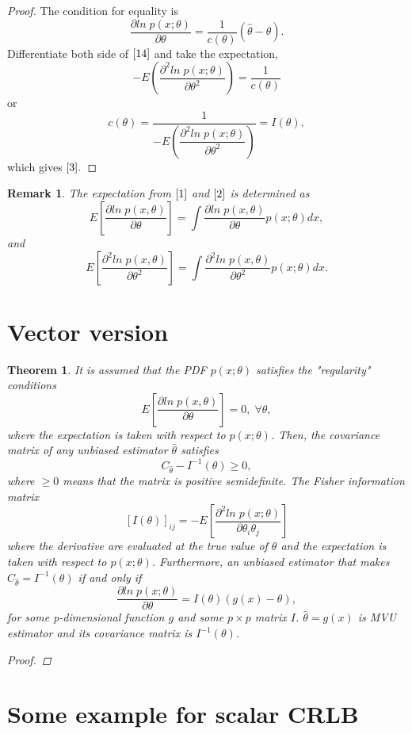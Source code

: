 \documentclass{article}
\newtheorem{theorem}{Theorem}
\newtheorem{remark}{Remark}
\begin{document}
\begin{proof}
The condition for equality is 
\begin{equation}\label{14}
\dfrac{\partial ln\; p(x;\theta)}{\partial \theta} = \dfrac{1}{c(\theta)}(\widehat{\theta} - \theta).
\end{equation}
Differentiate both side of $\eqref{14}$ and take the expectation, 
\begin{equation}
-E\left(\dfrac{\partial^{2} ln\; p(x;\theta)}{\partial \theta^{2}}\right) = \dfrac{1}{c(\theta)}
\end{equation}
or 
\begin{equation}
c(\theta) = \dfrac{1}{-E\left(\dfrac{\partial^{2} ln\; p(x;\theta)}{\partial \theta^{2}}\right)} = I(\theta),
\end{equation}
which gives $\eqref{3}.$
\end{proof}

\begin{remark}
The expectation from $\eqref{1}$ and $\eqref{2}$ is determined as
$$E\left[\dfrac{\partial ln \; p(x,\theta)}{\partial \theta}\right] = \int\dfrac{\partial ln \; p(x,\theta)}{\partial \theta}p(x;\theta)dx,$$
and 
$$E\left[\dfrac{\partial^{2} ln \; p(x,\theta)}{\partial \theta^{2}}\right] = \int\dfrac{\partial^{2} ln \; p(x,\theta)}{\partial \theta^{2}}p(x;\theta)dx.$$
\end{remark}

\section{Vector version}
\begin{theorem}
It is assumed that the PDF $p(x;\theta)$ satisfies the "regularity" conditions
\begin{equation}
E\left[\dfrac{\partial ln \; p(x,\theta)}{\partial \theta}\right] = 0, \; \forall \theta,
\end{equation}
where the expectation is taken with respect to $p(x;\theta)$. Then, the covariance matrix of any unbiased estimator $\widehat{\theta}$ satisfies 
\begin{equation}
    C_{\widehat{\theta}} - I^{-1}(\theta) \geq 0,
\end{equation}
where $\geq 0$ means that the matrix is positive semidefinite. The Fisher information matrix $$[I(\theta)]_{ij} = -E\left[\dfrac{\partial^{2}ln \; p(x;\theta)}{\partial \theta_{i}\theta_{j}}\right]$$
where the derivative are evaluated at the true value of $\theta$ and the expectation is taken with respect to $p(x;\theta)$. Furthermore, an unbiased estimator that makes $C_{\widehat{\theta}} = I^{-1}(\theta)$ if and only if
\begin{equation}
\dfrac{\partial ln \; p(x;\theta)}{\partial \theta} = I(\theta)(g(x) - \theta),
\end{equation}
for some p-dimensional function $g$ and some $p\times p$ matrix $I$. $\widehat{\theta} = g(x)$ is MVU estimator and its covariance matrix is $I^{-1}(\theta)$. 
\begin{proof}

\end{proof}
\end{theorem}

\section{Some example for scalar CRLB}


\end{document}
